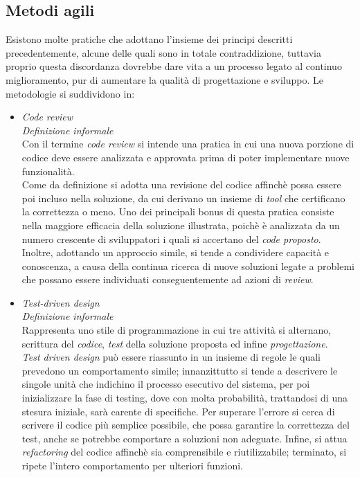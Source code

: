 \documentclass{article}
\begin{document}
\subsection*{Metodi agili}
\large
Esistono molte pratiche che adottano l'insieme dei principi descritti precedentemente, alcune delle quali sono in totale contraddizione, tuttavia proprio questa discordanza dovrebbe dare vita a un processo legato al continuo miglioramento, pur di aumentare la qualità di progettazione e sviluppo. Le metodologie si suddividono in:
\begin{itemize}[label={-}]
    \itemsep0em
    \item \textit{Code review}\vspace*{7pt}\\\textit{Definizione informale}\\Con il termine \textit{code review} si intende una pratica in cui una nuova porzione di codice deve essere analizzata e approvata prima di poter implementare nuove funzionalità.\vspace*{14pt}\\Come da definizione si adotta una revisione del codice affinchè possa essere poi incluso nella soluzione, da cui derivano un insieme di \textit{tool} che certificano la correttezza o meno. Uno dei principali bonus di questa pratica consiste nella maggiore efficacia della soluzione illustrata, poichè è analizzata da un numero crescente di sviluppatori i quali si accertano del \textit{code proposto}. Inoltre, adottando un approccio simile, si tende a condividere capacità e conoscenza, a causa della continua ricerca di nuove soluzioni legate a problemi che possano essere individuati conseguentemente ad azioni di \textit{review}. 
    \item \textit{Test-driven design}\vspace*{7pt}\\\textit{Definizione informale}\\Rappresenta uno stile di programmazione in cui tre attività si alternano, scrittura del \textit{codice}, \textit{test} della soluzione proposta ed infine \textit{progettazione}.\vspace*{14pt}\\\textit{Test driven design} può essere riassunto in un insieme di regole le quali prevedono un comportamento simile; innanzittutto si tende a descrivere le singole unità che indichino il processo esecutivo del sistema, per poi inizializzare la fase di testing, dove con molta probabilità, trattandosi di una stesura iniziale, sarà carente di specifiche. Per superare l'errore si cerca di scrivere il codice più semplice possibile, che possa garantire la correttezza del test, anche se potrebbe comportare a soluzioni non adeguate. Infine, si attua \textit{refactoring} del codice affinchè sia comprensibile e riutilizzabile; terminato, si ripete l'intero comportamento per ulteriori funzioni.

\end{itemize}
\end{document}

